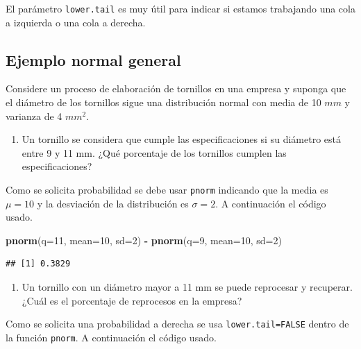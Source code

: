 \documentclass[10pt,]{krantz}
\makeatletter
\newenvironment{Shaded}{\begin{snugshade}}{\end{snugshade}}
\newcommand{\KeywordTok}[1]{\textcolor[rgb]{0.13,0.29,0.53}{\textbf{#1}}}
\newcommand{\DataTypeTok}[1]{\textcolor[rgb]{0.13,0.29,0.53}{#1}}
\newcommand{\DecValTok}[1]{\textcolor[rgb]{0.00,0.00,0.81}{#1}}
\newcommand{\StringTok}[1]{\textcolor[rgb]{0.31,0.60,0.02}{#1}}
\newcommand{\OperatorTok}[1]{\textcolor[rgb]{0.81,0.36,0.00}{\textbf{#1}}}
\newcommand{\NormalTok}[1]{#1}
\providecommand{\tightlist}{%
  \setlength{\itemsep}{0pt}\setlength{\parskip}{0pt}}
\newenvironment{kframe}{%
\medskip{}
\setlength{\fboxsep}{.8em}
 \def\at@end@of@kframe{}%
 \ifinner\ifhmode%
  \def\at@end@of@kframe{\end{minipage}}%
  \begin{minipage}{\columnwidth}%
 \fi\fi%
 \def\FrameCommand##1{\hskip\@totalleftmargin \hskip-\fboxsep
 \colorbox{shadecolor}{##1}\hskip-\fboxsep
     \hskip-\linewidth \hskip-\@totalleftmargin \hskip\columnwidth}%
 \MakeFramed {\advance\hsize-\width
   \@totalleftmargin\z@ \linewidth\hsize
   \@setminipage}}%
 {\par\unskip\endMakeFramed%
 \at@end@of@kframe}
\renewenvironment{Shaded}{\begin{kframe}}{\end{kframe}}
\let\BeginKnitrBlock\begin \let\EndKnitrBlock\end
\makeatother
\begin{document}
\BeginKnitrBlock{rmdtip}
El parámetro \texttt{lower.tail} es muy útil para indicar si estamos
trabajando una cola a izquierda o una cola a derecha.
\EndKnitrBlock{rmdtip}

\subsection*{Ejemplo normal general}\label{ejemplo-normal-general}


Considere un proceso de elaboración de tornillos en una empresa y
suponga que el diámetro de los tornillos sigue una distribución normal
con media de 10 \(mm\) y varianza de 4 \(mm^2\).

\begin{enumerate}
\def\labelenumi{\arabic{enumi})}
\tightlist
\item
  Un tornillo se considera que cumple las especificaciones si su
  diámetro está entre 9 y 11 mm. ¿Qué porcentaje de los tornillos
  cumplen las especificaciones?
\end{enumerate}

Como se solicita probabilidad se debe usar \texttt{pnorm} indicando que
la media es \(\mu=10\) y la desviación de la distribución es
\(\sigma=2\). A continuación el código usado.

\begin{Shaded}
\begin{Highlighting}[]
\KeywordTok{pnorm}\NormalTok{(}\DataTypeTok{q=}\DecValTok{11}\NormalTok{, }\DataTypeTok{mean=}\DecValTok{10}\NormalTok{, }\DataTypeTok{sd=}\DecValTok{2}\NormalTok{) }\OperatorTok{-}\StringTok{ }\KeywordTok{pnorm}\NormalTok{(}\DataTypeTok{q=}\DecValTok{9}\NormalTok{, }\DataTypeTok{mean=}\DecValTok{10}\NormalTok{, }\DataTypeTok{sd=}\DecValTok{2}\NormalTok{)}
\end{Highlighting}
\end{Shaded}

\begin{verbatim}
## [1] 0.3829
\end{verbatim}

\begin{enumerate}
\def\labelenumi{\arabic{enumi})}
\setcounter{enumi}{1}
\tightlist
\item
  Un tornillo con un diámetro mayor a 11 mm se puede reprocesar y
  recuperar. ¿Cuál es el porcentaje de reprocesos en la empresa?
\end{enumerate}

Como se solicita una probabilidad a derecha se usa
\texttt{lower.tail=FALSE} dentro de la función \texttt{pnorm}. A
continuación el código usado.
\end{document}
